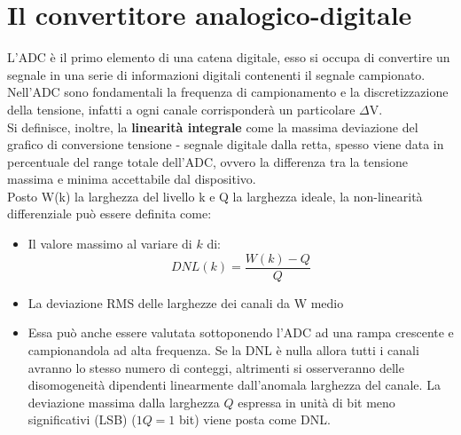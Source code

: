 \section{Il convertitore analogico-digitale}
L'ADC \`e il primo elemento di una catena digitale, esso si occupa di convertire un segnale in una serie di informazioni digitali contenenti il segnale campionato.\\
Nell'ADC sono fondamentali la frequenza di campionamento e la discretizzazione della tensione, infatti a ogni canale corrisponder\`a un particolare $\Delta$V.\\
Si definisce, inoltre, la \textbf{linearit\`a integrale} come la massima deviazione del grafico di conversione tensione - segnale digitale dalla retta,
spesso viene data in percentuale del range totale dell'ADC, ovvero la differenza tra la tensione massima e minima accettabile dal dispositivo.\\
Posto W(k) la larghezza del livello k e Q la larghezza ideale, la non-linearit\`a differenziale pu\`o essere definita come:
\begin{itemize}
\item Il valore massimo al variare di $k$ di:
\begin{equation*}
DNL(k) = \frac{W(k) - Q}{Q}
\end{equation*}
\item La deviazione RMS delle larghezze dei canali da W medio
\item Essa pu\`o anche essere valutata sottoponendo l'ADC ad una rampa crescente e campionandola ad alta frequenza.
Se la DNL \`e nulla allora tutti i canali avranno lo stesso numero di conteggi, altrimenti si osserveranno delle disomogeneit\`a dipendenti linearmente dall'anomala larghezza del canale.
La deviazione massima dalla larghezza $Q$ espressa in unit\`a di bit meno significativi (LSB) ($1Q=1$ bit) viene posta come DNL.
\end{itemize}
